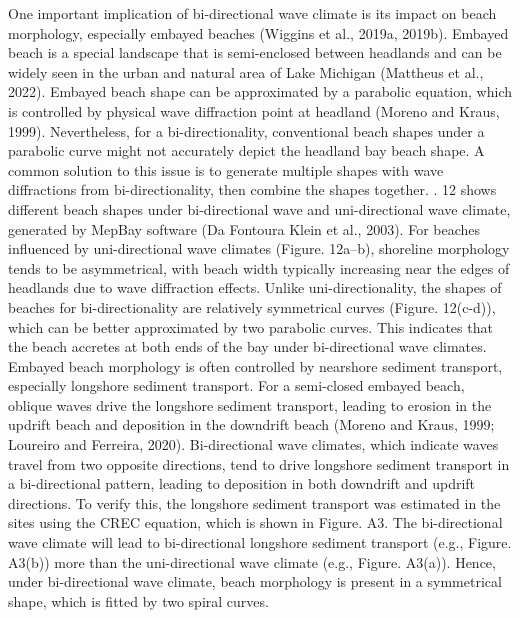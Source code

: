 One important implication of bi-directional wave climate is its impact on beach morphology, especially embayed beaches (Wiggins et al., 2019a, 2019b). Embayed beach is a special landscape that is semi-enclosed between headlands and can be widely seen in the urban and natural area of Lake Michigan (Mattheus et al., 2022). Embayed beach shape can be approximated by a parabolic equation, which is controlled by physical wave diffraction point at headland (Moreno and Kraus, 1999). Nevertheless, for a bi-directionality, conventional beach shapes under a parabolic curve might not accurately depict the headland bay beach shape. A common solution to this issue is to generate multiple shapes with wave diffractions from bi-directionality, then combine the shapes together. . 12 shows different beach shapes under bi-directional wave and uni-directional wave climate, generated by MepBay software (Da Fontoura Klein et al., 2003). For beaches influenced by uni-directional wave climates (Figure. 12a–b), shoreline morphology tends to be asymmetrical, with beach width typically increasing near the edges of headlands due to wave diffraction effects. Unlike uni-directionality, the shapes of beaches for bi-directionality are relatively symmetrical curves (Figure. 12(c-d)), which can be better approximated by two parabolic curves. This indicates that the beach accretes at both ends of the bay under bi-directional wave climates. Embayed beach morphology is often controlled by nearshore sediment transport, especially longshore sediment transport. For a semi-closed embayed beach, oblique waves drive the longshore sediment transport, leading to erosion in the updrift beach and deposition in the downdrift beach (Moreno and Kraus, 1999; Loureiro and Ferreira, 2020). Bi-directional wave climates, which indicate waves travel from two opposite directions, tend to drive longshore sediment transport in a bi-directional pattern, leading to deposition in both downdrift and updrift directions. To verify this, the longshore sediment transport was estimated in the sites using the CREC equation, which is shown in Figure. A3. The bi-directional wave climate will lead to bi-directional longshore sediment transport (e.g., Figure. A3(b)) more than the uni-directional wave climate (e.g., Figure. A3(a)). Hence, under bi-directional wave climate, beach morphology is present in a symmetrical shape, which is fitted by two spiral curves. 


